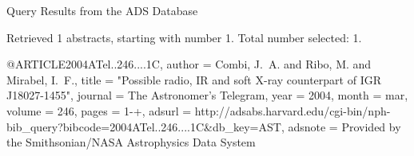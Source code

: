Query Results from the ADS Database


Retrieved 1 abstracts, starting with number 1.  Total number selected: 1.

@ARTICLE{2004ATel..246....1C,
   author = {{Combi}, J.~A. and {Ribo}, M. and {Mirabel}, I.~F.},
    title = "{Possible radio, IR and soft X-ray counterpart of IGR J18027-1455}",
  journal = {The Astronomer's Telegram},
     year = 2004,
    month = mar,
   volume = 246,
    pages = {1-+},
   adsurl = {http://adsabs.harvard.edu/cgi-bin/nph-bib_query?bibcode=2004ATel..246....1C&db_key=AST},
  adsnote = {Provided by the Smithsonian/NASA Astrophysics Data System}
}


